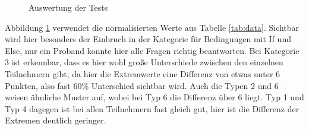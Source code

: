 	
	\begin{figure}[H]
		\centering
		\caption[Auswertung]{Auswertung der Tests}
		\label{img:auswertung}
	\end{figure}
	
	Abbildung \ref{img:auswertung} verwendet die normalisierten Werte aus Tabelle \ref{tab:data}. Sichtbar wird hier besonders der Einbruch in der Kategorie für Bedingungen mit If und Else, nur ein Proband konnte hier alle Fragen richtig beantworten. Bei Kategorie 3 ist erkennbar, dass es hier wohl große Unterschiede zwischen den einzelnen Teilnehmern gibt, da hier die Extremwerte eine Differenz von etwas unter 6 Punkten, also fast 60\% Unterschied sichtbar wird. Auch die Typen 2 und 6 weisen ähnliche Muster auf, wobei bei Typ 6 die Differenz über 6 liegt. Typ 1 und Typ 4 dagegen ist bei allen Teilnehmern fast gleich gut, hier ist die Differenz der Extremen deutlich geringer.\\ 
	
	
	
	
	

